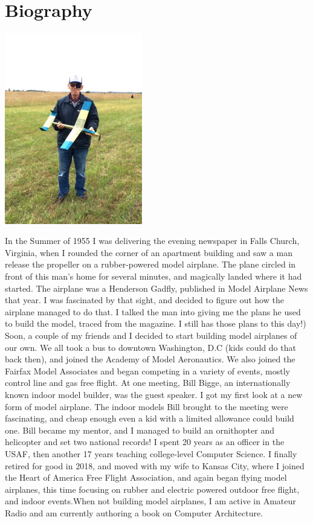 \section{Biography}
\begin{centering}
\includegraphics[width=0.45\textwidth]{../assets/images/RoieBlack.jpg}
\end{centering}

In the Summer of 1955 I was delivering the evening newspaper in Falls Church,
Virginia, when I rounded the corner of an apartment building and saw a man
release the propeller on a rubber-powered model airplane. The plane circled in
front of this man's home for several minutes, and magically landed where it had
started. The airplane was a Henderson Gadfly, published in Model Airplane News
that year.  I was fascinated by that sight, and decided to figure out how the
airplane managed to do that. I talked the man into giving me the plans he used
to build the model, traced from the magazine. I still has those plans to this
day!) Soon, a couple of my friends and I decided to start building model
airplanes of our own.  We all took a bus to downtown Washington, D.C (kids
could do that back then), and joined the Academy of Model Aeronautics. We also
joined the Fairfax Model Associates and began competing in a variety of events,
mostly control line and gas free flight. At one meeting, Bill Bigge, an
internationally known indoor model builder, was the guest speaker. I got my
first look at a new form of model airplane. The indoor models Bill brought to
the meeting were fascinating, and cheap enough even a kid with a limited
allowance could build one.  Bill became my mentor, and  I managed to build an
ornithopter and helicopter and set two national records! I spent 20 years as an
officer in the USAF, then another 17 years teaching college-level Computer
Science. I finally retired for good in 2018, and moved with my wife to Kansas
City, where I joined the Heart of America Free Flight Association, and again
began flying model airplanes, this time focusing on rubber and electric powered
outdoor free flight, and indoor events.When not building model airplanes, I am
active in Amateur Radio and am currently authoring a book on Computer
Architecture.
